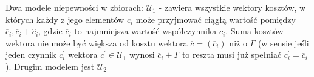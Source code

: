 Dwa modele niepewności w zbiorach: $\mathcal{U}_{1}$ - zawiera wszystkie wektory kosztów, w których każdy z jego elementów $c_{i}$ może przyjmować ciągłą wartość pomiędzy $\overline{c}_{i}, \overline{c}_{i} + \hat{c}_{i}$, gdzie $\overline{c}_{i}$ to najmniejsza wartość współczynnika $c_{i}$. Suma kosztów wektora nie może być większa od kosztu wektora $\overline{c} = \left( \overline{c}_{i} \right)$ niż o $\Gamma$ (w sensie jeśli jeden czynnik $c^{\prime}_{i}$ wektora $c^{\prime} \in \mathcal{U}_{1}$ wynosi $\overline{c}_{i} + \Gamma$ to reszta musi już spełniać $c^{\prime}_{i} = \overline{c}_{i}$).
Drugim modelem jest $\mathcal{U}_{2}$
